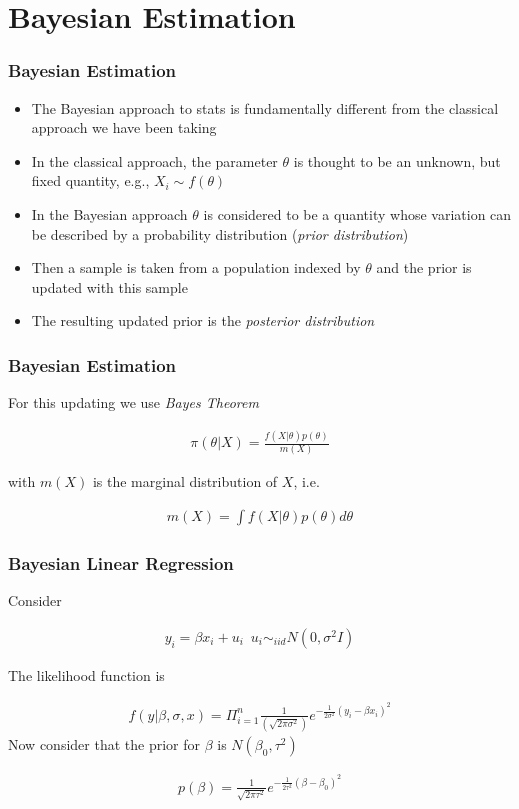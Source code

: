 \documentclass[
  shownotes,
  xcolor={svgnames},
  hyperref={colorlinks,citecolor=DarkBlue,linkcolor=DarkRed,urlcolor=DarkBlue}
  ]{beamer}
\begin{document}
\section{Bayesian Estimation}
\begin{frame}[fragile]
\frametitle{Bayesian Estimation}

\begin{itemize}
\item The Bayesian approach to stats is fundamentally different from the classical approach we have been taking
\medskip
\item In the classical approach, the parameter $\theta$ is thought to be an unknown, but fixed quantity, e.g., $X_i\sim f(\theta)$
\medskip
\item In the Bayesian approach $\theta$ is considered to be a quantity whose variation can be described by a probability distribution  ({\it prior distribution})
\medskip
\item Then a sample is taken from a population indexed by $\theta$ and the prior is updated with this sample
\medskip
\item The resulting updated prior is the {\it posterior distribution}
\end{itemize}


\end{frame}
\begin{frame}[fragile]
\frametitle{Bayesian Estimation}
For this updating we use {\it Bayes Theorem}

\bigskip
\begin{align}
\pi (\theta|X)=\frac{f(X|\theta)p(\theta)}{m(X)}
\end{align}

\bigskip
with $m(X)$ is the marginal distribution of $X$, i.e.

\begin{align}
m(X)=\int f(X|\theta)p(\theta)d\theta
\end{align}

\end{frame}
\begin{frame}[fragile]
\frametitle{Bayesian Linear Regression}

Consider

\begin{align}
y_i= \beta x_i+u_i\,\,\,u_i \sim_{iid} N(0,\sigma^2I)
\end{align}

The likelihood function is

\begin{align}
f(y|\beta,\sigma,x)=\Pi_{i=1}^n\frac{1}{(\sqrt{2\pi\sigma^2})}e^{-\frac{1}{2\sigma^2}(y_i-\beta x_i)^2}
\end{align}
Now consider that the prior for $\beta$ is $N(\beta_0,\tau^2)$

\begin{align}
p(\beta)=\frac{1}{\sqrt{2\pi\tau^2}}e^{-\frac{1}{2\tau^2}{(\beta-\beta_0)^2}}
\end{align}

\end{frame}
\end{document}
